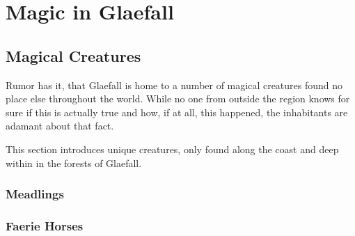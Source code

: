 \chapter{Magic in Glaefall}

\section{Magical Creatures}

Rumor has it, that Glaefall is home to a number of magical creatures found no place else throughout the world.
While no one from outside the region knows for sure if this is actually true and how, if at all, this happened, the inhabitants are adamant about that fact.

This section introduces unique creatures, only found along the coast and deep within in the forests of Glaefall.



\pagebreak

\subsection{Meadlings}

\subsection{Faerie Horses}